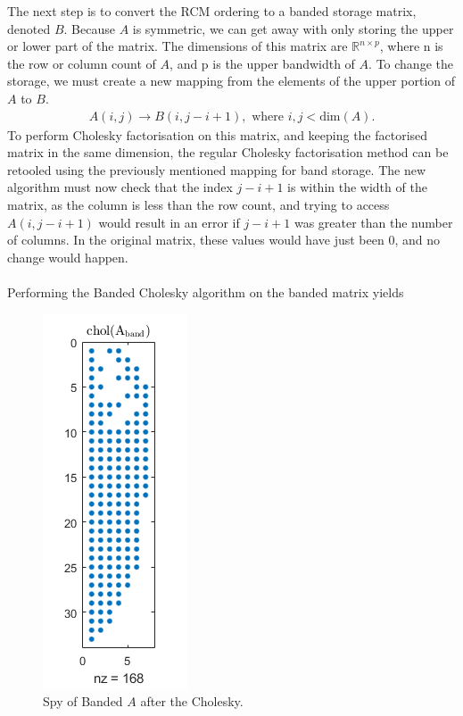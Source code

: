 \documentclass[12pt,a4paper]{article}
\begin{document}
The next step is to convert the RCM ordering to a banded storage matrix, denoted $B$. Because $A$ is symmetric, we can get away with only storing the upper or lower part of the matrix. The dimensions of this matrix are $\mathbb{R}^{n\times p}$, where n is the row or column count of $A$, and p is the upper bandwidth of $A$. To change the storage, we must create a new mapping from the elements of the upper portion of $A$ to $B$.
\begin{align*}
A(i,j)\to B(i,j-i+1), \text{ where } i,j < \text{dim}(A).
\end{align*}
To perform Cholesky factorisation on this matrix, and keeping the factorised matrix in the same dimension, the regular Cholesky factorisation method can be retooled using the previously mentioned mapping for band storage.
The new algorithm must now check that the index $j-i+1$ is within the width of the matrix, as the column is less than the row count, and trying to access $A(i,j-i+1)$ would result in an error if $j-i+1$ was greater than the number of columns. In the original matrix, these values would have just been 0, and no change would happen.\\\\Performing the Banded Cholesky algorithm on the banded matrix yields
\begin{figure}[H]
	\begin{center}
		\includegraphics[width=0.3\linewidth]{images/cholband.png}
		\caption{Spy of Banded $A$ after the Cholesky.}
		\label{fig:cholband}
	\end{center}
\end{figure}
\end{document}
